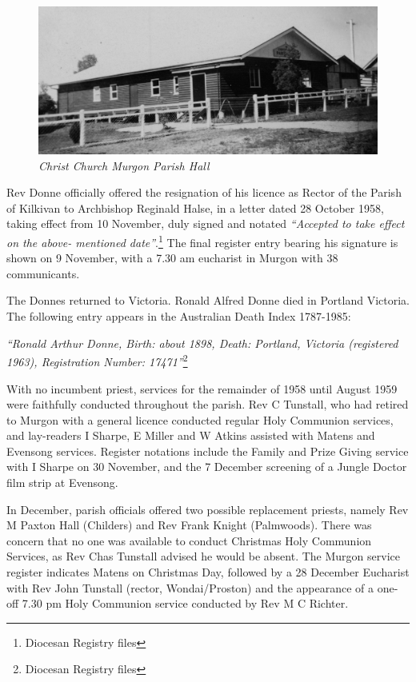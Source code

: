 \begin{figure}[!htb]
\begin{center}
\includegraphics[width=1.\textwidth,center]{../images/churchHallEarly.jpg}
\caption{\itshape Christ Church Murgon Parish Hall}
\end{center}
\end{figure}




Rev Donne officially offered the resignation of his licence as Rector of the Parish of Kilkivan to Archbishop Reginald Halse, in a letter dated 28 October 1958, taking effect from 10 November, duly signed and notated \emph{``Accepted to take effect on the above- mentioned date''}.\footnote{Diocesan Registry files} The final register entry bearing his signature is shown on 9 November, with a 7.30 am eucharist in Murgon with 38 communicants.


The Donnes returned to Victoria. Ronald Alfred Donne died in Portland Victoria. The following entry appears in the Australian Death Index 1787-1985:



\emph{``Ronald Arthur Donne, Birth: about 1898, Death: Portland, Victoria (registered 1963), Registration Number: 17471''}\footnote{Diocesan Registry files}


With no incumbent priest, services for the remainder of 1958 until August 1959 were faithfully conducted throughout the parish. Rev C Tunstall, who had retired to Murgon with a general licence conducted regular Holy Communion services, and lay-readers I Sharpe, E Miller and W Atkins assisted with Matens and Evensong services. Register notations include the Family and Prize Giving service with I Sharpe on 30 November, and the 7 December screening of a Jungle Doctor film strip at Evensong.



In December, parish officials offered two possible replacement priests, namely Rev M Paxton Hall (Childers) and Rev Frank Knight (Palmwoods). There was concern that no one was available to conduct Christmas Holy Communion Services, as Rev Chas Tunstall advised he would be absent. The Murgon service register indicates Matens on Christmas Day, followed by a 28 December Eucharist with Rev John Tunstall (rector, Wondai/Proston) and the appearance of a one-off 7.30 pm Holy Communion service conducted by Rev M C Richter.



